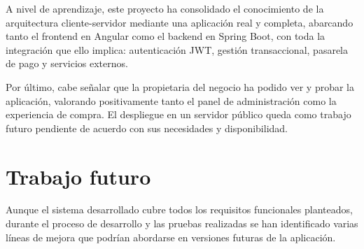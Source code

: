 A nivel de aprendizaje, este proyecto ha consolidado el conocimiento de la arquitectura cliente-servidor mediante una aplicación real y completa, abarcando tanto el frontend en Angular como el backend en Spring Boot, con toda la integración que ello implica: autenticación JWT, gestión transaccional, pasarela de pago y servicios externos.

Por último, cabe señalar que la propietaria del negocio ha podido ver y probar la aplicación, valorando positivamente tanto el panel de administración como la experiencia de compra. El despliegue en un servidor público queda como trabajo futuro pendiente de acuerdo con sus necesidades y disponibilidad.

\section{Trabajo futuro}

Aunque el sistema desarrollado cubre todos los requisitos funcionales planteados, durante el proceso de desarrollo y las pruebas realizadas se han identificado varias líneas de mejora que podrían abordarse en versiones futuras de la aplicación.

